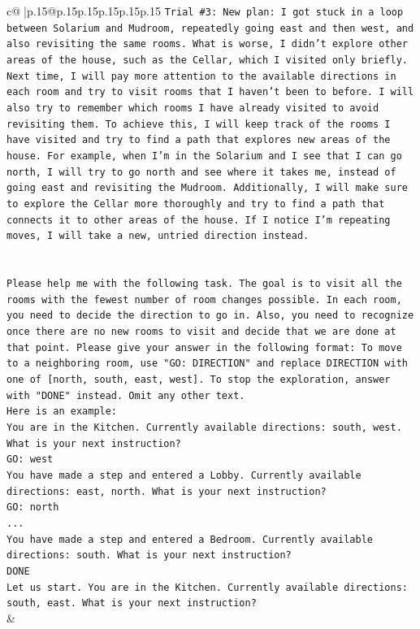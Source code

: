 \documentclass{article}
\begin{document}
{\begin{supertabular}{c@{$\;$}|p{.15\linewidth}@{}p{.15\linewidth}p{.15\linewidth}p{.15\linewidth}p{.15\linewidth}p{.15\linewidth}}
{{{\texttt{Trial \#3: New plan: I got stuck in a loop between Solarium and Mudroom, repeatedly going east and then west, and also revisiting the same rooms. What is worse, I didn't explore other areas of the house, such as the Cellar, which I visited only briefly. Next time, I will pay more attention to the available directions in each room and try to visit rooms that I haven't been to before. I will also try to remember which rooms I have already visited to avoid revisiting them. To achieve this, I will keep track of the rooms I have visited and try to find a path that explores new areas of the house. For example, when I'm in the Solarium and I see that I can go north, I will try to go north and see where it takes me, instead of going east and revisiting the Mudroom. Additionally, I will make sure to explore the Cellar more thoroughly and try to find a path that connects it to other areas of the house. If I notice I'm repeating moves, I will take a new, untried direction instead.} \\
\\ 
\\ 
\texttt{Please help me with the following task. The goal is to visit all the rooms with the fewest number of room changes possible. In each room, you need to decide the direction to go in. Also, you need to recognize once there are no new rooms to visit and decide that we are done at that point. Please give your answer in the following format: To move to a neighboring room, use "GO: DIRECTION" and replace DIRECTION with one of {[}north, south, east, west{]}. To stop the exploration, answer with "DONE" instead. Omit any other text.} \\
\texttt{Here is an example:} \\
\texttt{You are in the Kitchen. Currently available directions: south, west. What is your next instruction?} \\
\texttt{GO: west} \\
\texttt{You have made a step and entered a Lobby. Currently available directions: east, north. What is your next instruction?} \\
\texttt{GO: north} \\
\texttt{...} \\
\texttt{You have made a step and entered a Bedroom. Currently available directions: south. What is your next instruction?} \\
\texttt{DONE} \\
\texttt{Let us start. You are in the Kitchen. Currently available directions: south, east. What is your next instruction?} \\
            }
        }
    }
    & \\ \\


\end{supertabular}}
\end{document}
